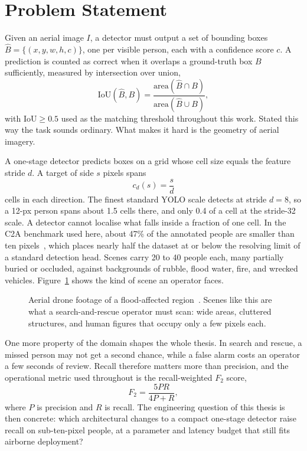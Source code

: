 \section{Problem Statement}
Given an aerial image $I$, a detector must output a set of bounding boxes
$\hat{B} = \{(x, y, w, h, c)\}$, one per visible person, each with a confidence
score $c$. A prediction is counted as correct when it overlaps a ground-truth
box $B$ sufficiently, measured by intersection over union,
\begin{equation}
  \mathrm{IoU}(\hat{B}, B) =
    \frac{\mathrm{area}(\hat{B} \cap B)}{\mathrm{area}(\hat{B} \cup B)},
  \label{eq:iou}
\end{equation}
with $\mathrm{IoU} \geq 0.5$ used as the matching threshold throughout this
work. Stated this way the task sounds ordinary. What makes it hard is the
geometry of aerial imagery.

A one-stage detector predicts boxes on a grid whose cell size equals the
feature stride $d$. A target of side $s$ pixels spans
\begin{equation}
  c_d(s) = \frac{s}{d}
  \label{eq:coverage}
\end{equation}
cells in each direction. The finest standard YOLO scale detects at stride
$d = 8$, so a 12-px person spans about 1.5 cells there, and only 0.4 of a cell
at the stride-32 scale. A detector cannot localise what falls inside a
fraction of one cell. In the C2A benchmark used here, about 47\% of the
annotated people are smaller than ten pixels~\cite{nihal2024c2a}, which places
nearly half the dataset at or below the resolving limit of a standard
detection head. Scenes carry 20 to 40 people each, many partially buried or
occluded, against backgrounds of rubble, flood water, fire, and wrecked
vehicles. Figure~\ref{fig:introscene} shows the kind of scene an operator
faces.

\begin{figure}[tbp]
  \centering
  \caption[Aerial drone footage of a flood-affected region.]{Aerial drone footage of a flood-affected region~\cite{agiindia2024drones}.
  Scenes like this are what a search-and-rescue operator must scan: wide areas,
  cluttered structures, and human figures that occupy only a few pixels each.}
  \label{fig:introscene}
\end{figure}

One more property of the domain shapes the whole thesis. In search and rescue,
a missed person may not get a second chance, while a false alarm costs an
operator a few seconds of review. Recall therefore matters more than
precision, and the operational metric used throughout is the recall-weighted
$F_2$ score,
\begin{equation}
  F_2 = \frac{5PR}{4P + R},
  \label{eq:f2}
\end{equation}
where $P$ is precision and $R$ is recall. The engineering question of this
thesis is then concrete: which architectural changes to a compact one-stage
detector raise recall on sub-ten-pixel people, at a parameter and latency
budget that still fits airborne deployment?

